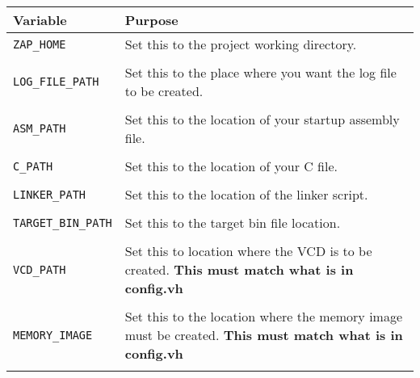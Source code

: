\documentclass[11pt]{article}
\begin{document}
\begin{tabularx}{\textwidth}{| X | X |}
\hline
Variable & Purpose \\
\hline
\texttt{ZAP\_HOME} & Set this to the project working directory.\\\\
\texttt{LOG\_FILE\_PATH} & Set this to the place where you want the log file to 
be created.\\\\
\texttt{ASM\_PATH} & Set this to the location of your startup assembly file.
\\\\
\texttt{C\_PATH} & Set this to the location of your C file. \\\\
\texttt{LINKER\_PATH} & Set this to the location of the linker script. \\\\
\texttt{TARGET\_BIN\_PATH} & Set this to the target bin file location. \\\\
\texttt{VCD\_PATH} & Set this to location where the VCD is to be created. 
\textbf{This must match what is in config.vh} \\\\
\texttt{MEMORY\_IMAGE} & Set this to the location where the memory image must be
created. \textbf{This must match what is in config.vh} \\\\
\hline
\end{tabularx}

\end{document}
